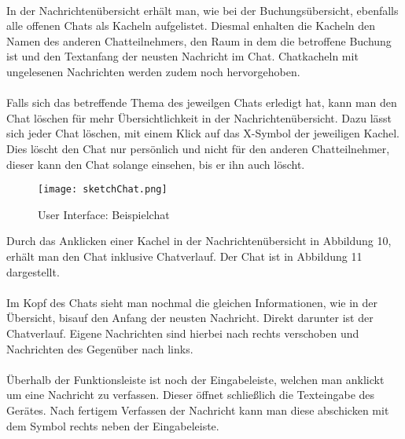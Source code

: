 \paragraph{} In der Nachrichtenübersicht erhält man, wie bei der Buchungsübersicht, ebenfalls alle offenen Chats als Kacheln aufgelistet. 
Diesmal enhalten die Kacheln den Namen des anderen Chatteilnehmers, den Raum in dem die betroffene Buchung ist und den Textanfang der neusten Nachricht im Chat.
Chatkacheln mit ungelesenen Nachrichten werden zudem noch hervorgehoben.

\paragraph{} Falls sich das betreffende Thema des jeweilgen Chats erledigt hat, kann man den Chat löschen für mehr Übersichtlichkeit in der Nachrichtenübersicht.
Dazu lässt sich jeder Chat löschen, mit einem Klick auf das X-Symbol der jeweiligen Kachel.
Dies löscht den Chat nur persönlich und nicht für den anderen Chatteilnehmer, dieser kann den Chat solange einsehen, bis er ihn auch löscht.

\newpage
\begin{wrapfigure}{r}{5.5cm}
  \texttt{[image: sketchChat.png]}
  \caption{User Interface: Beispielchat}
\end{wrapfigure}

Durch das Anklicken einer Kachel in der Nachrichtenübersicht in Abbildung 10, erhält man den Chat inklusive Chatverlauf.
Der Chat ist in Abbildung 11 dargestellt.

\paragraph{} Im Kopf des Chats sieht man nochmal die gleichen Informationen, wie in der Übersicht, bisauf den Anfang der neusten Nachricht. 
Direkt darunter ist der Chatverlauf.
Eigene Nachrichten sind hierbei nach rechts verschoben und Nachrichten des Gegenüber nach links.

\paragraph{}Überhalb der Funktionsleiste ist noch der Eingabeleiste, welchen man anklickt um eine Nachricht zu verfassen. 
Dieser öffnet schließlich die Texteingabe des Gerätes.
Nach fertigem Verfassen der Nachricht kann man diese abschicken mit dem Symbol rechts neben der Eingabeleiste. 
\\
\\
\\
\\
\\
\\
